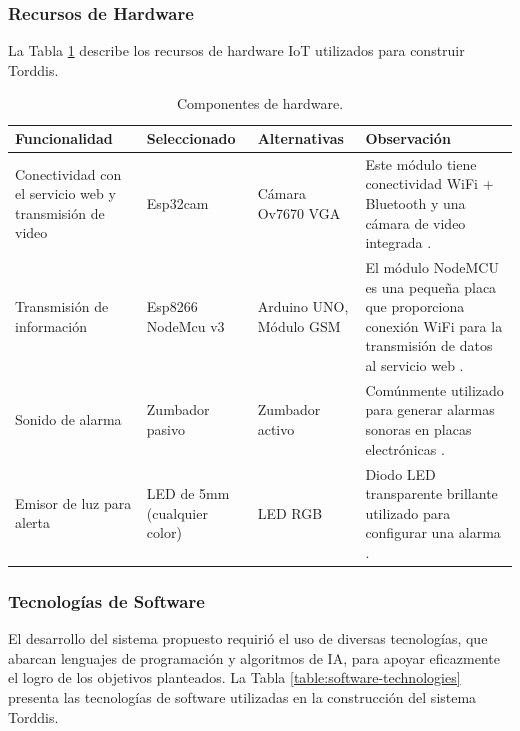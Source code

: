 \documentclass[a4paper,fleqn]{cas-sc}
\begin{document}
				\subsubsection*{Recursos de Hardware}
					La Tabla \ref{table:hardware-components} describe los recursos de hardware IoT utilizados para construir Torddis. 
					
					\begin{table}[htb]
						\caption{Componentes de hardware.}
						\label{table:hardware-components}
						\centering
						\begin{tabular}{p{}p{0.15\textwidth}p{}p{}}
							\hline
							\multicolumn{1}{l}{\textbf{Funcionalidad}} & \multicolumn{1}{l}{\textbf{Seleccionado}} & \multicolumn{1}{l}{\textbf{Alternativas}} & \multicolumn{1}{l}{\textbf{Observación}} \\ \hline
							Conectividad con el servicio web y transmisión de video & Esp32cam & Cámara Ov7670 VGA & Este módulo tiene conectividad WiFi + Bluetooth y una cámara de video integrada \citep{CasasSanchez2022}. \\
							Transmisión de información & Esp8266 NodeMcu v3 & Arduino UNO, Módulo GSM & El módulo NodeMCU es una pequeña placa que proporciona conexión WiFi para la transmisión de datos al servicio web \citep{Barai2019}. \\
							Sonido de alarma & Zumbador pasivo & Zumbador activo & Comúnmente utilizado para generar alarmas sonoras en placas electrónicas \citep{Adebisi2023development}. \\
							Emisor de luz para alerta & LED de 5mm (cualquier color) & LED RGB & Diodo LED transparente brillante utilizado para configurar una alarma \citep{Upender2020}.  \\ \hline
						\end{tabular}
					\end{table}
				
				\subsubsection*{Tecnologías de Software}
					El desarrollo del sistema propuesto requirió el uso de diversas tecnologías, que abarcan lenguajes de programación y algoritmos de IA, para apoyar eficazmente el logro de los objetivos planteados. La Tabla \ref{table:software-technologies} presenta las tecnologías de software utilizadas en la construcción del sistema Torddis.
					
\end{document}
